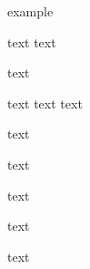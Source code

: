 \documentclass[11pt]{article}
\begin{document}
\begin{CJK*}{UTF8}{gkai}
    
    \begin{algorithm}
        \caption{example}
        \begin{algorithmic}[1]
            
            \Require text
            \Ensure text
            
            \State text
            \EndIf
            \State

            \State text   
            \State text       
            \Else   
            \State text  
            \EndIf
            \State
            
            \State text
            \EndFor
            \State
                
            \State text
            \EndFor
            \State
                
            \State text 
            \EndWhile
            \State
                
            \Repeat 
            \State text
            \State
                
            \Loop 
            \State text
            \EndLoop
            \State
            
            \State {}
        \end{algorithmic}
    \end{algorithm}

    \end{CJK*}
\end{document}
